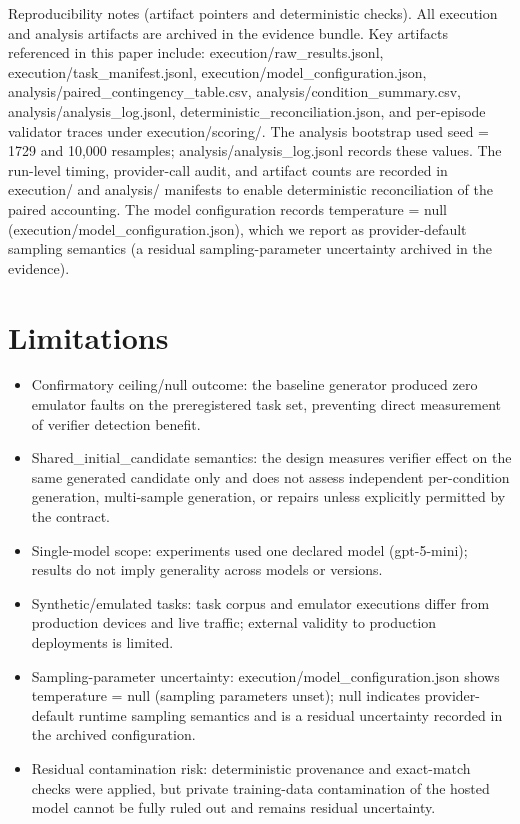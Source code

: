 \documentclass[conference]{IEEEtran}
\begin{document}
Reproducibility notes (artifact pointers and deterministic checks). All execution and analysis artifacts are archived in the evidence bundle. Key artifacts referenced in this paper include: execution/raw\_results.jsonl, execution/task\_manifest.jsonl, execution/model\_configuration.json, analysis/paired\_contingency\_table.csv, analysis/condition\_summary.csv, analysis/analysis\_log.jsonl, deterministic\_reconciliation.json, and per-episode validator traces under execution/scoring/. The analysis bootstrap used seed = 1729 and 10,000 resamples; analysis/analysis\_log.jsonl records these values. The run-level timing, provider-call audit, and artifact counts are recorded in execution/ and analysis/ manifests to enable deterministic reconciliation of the paired accounting. The model configuration records temperature = null (execution/model\_configuration.json), which we report as provider-default sampling semantics (a residual sampling-parameter uncertainty archived in the evidence).

\section{Limitations}
\begin{itemize}
\item Confirmatory ceiling/null outcome: the baseline generator produced zero emulator faults on the preregistered task set, preventing direct measurement of verifier detection benefit.
\item Shared\_initial\_candidate semantics: the design measures verifier effect on the same generated candidate only and does not assess independent per-condition generation, multi-sample generation, or repairs unless explicitly permitted by the contract.
\item Single-model scope: experiments used one declared model (gpt-5-mini); results do not imply generality across models or versions.
\item Synthetic/emulated tasks: task corpus and emulator executions differ from production devices and live traffic; external validity to production deployments is limited.
\item Sampling-parameter uncertainty: execution/model\_configuration.json shows temperature = null (sampling parameters unset); null indicates provider-default runtime sampling semantics and is a residual uncertainty recorded in the archived configuration.
\item Residual contamination risk: deterministic provenance and exact-match checks were applied, but private training-data contamination of the hosted model cannot be fully ruled out and remains residual uncertainty.
\end{itemize}
\end{document}
